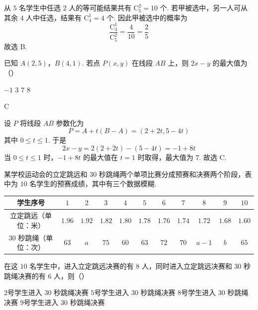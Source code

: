 \begin{solution}
从 \(5\) 名学生中任选 \(2\) 人的等可能结果共有 \(\mathrm C_5^2=10\) 个. 若甲被选中，另一人可从其余 \(4\) 人中任选，结果有 \(\mathrm C_4^1=4\) 个. 因此甲被选中的概率为
\[
\frac{\mathrm C_4^1}{\mathrm C_5^2}=\frac{4}{10}=\frac25
\]
故选 B.
\end{solution}

\begin{problem}
已知 \(A(2,5)\)，\(B(4,1)\). 若点 \(P(x,y)\) 在线段 \(AB\) 上，则 \(2x-y\) 的最大值为（\quad）

\choices
    {\(-1\)}
    {\(3\)}
    {\(7\)}
    {\(8\)}
\end{problem}

\begin{answer}
C
\end{answer}

\begin{solution}
设 \(P\) 将线段 \(AB\) 参数化为
\[
P=A+t(B-A)=(2+2t,5-4t)
\]
其中 \(0\leq t\leq1\).
于是
\[
2x-y=2(2+2t)-(5-4t)=-1+8t
\]
当 \(0\leq t\leq1\) 时，\(-1+8t\) 的最大值在 \(t=1\) 时取得，最大值为 \(7\). 故选 C.
\end{solution}

\begin{problem}
某学校运动会的立定跳远和 \(30\) 秒跳绳两个单项比赛分成预赛和决赛两个阶段，表中为 \(10\) 名学生的预赛成绩，其中有三个数据模糊.

\begin{center}
\begin{tabular}{|c|c|c|c|c|c|c|c|c|c|c|}
\hline
学生序号 & \(1\) & \(2\) & \(3\) & \(4\) & \(5\) & \(6\) & \(7\) & \(8\) & \(9\) & \(10\) \\
\hline
立定跳远（单位：米） & \(1.96\) & \(1.92\) & \(1.82\) & \(1.80\) & \(1.78\) & \(1.76\) & \(1.74\) & \(1.72\) & \(1.68\) & \(1.60\) \\
\hline
\(30\) 秒跳绳（单位：次） & \(63\) & \(a\) & \(75\) & \(60\) & \(63\) & \(72\) & \(70\) & \(a-1\) & \(b\) & \(65\) \\
\hline
\end{tabular}
\end{center}

在这 \(10\) 名学生中，进入立定跳远决赛的有 \(8\) 人，同时进入立定跳远决赛和 \(30\) 秒跳绳决赛的有 \(6\) 人，则（\quad）

\choices
    {\(2\)号学生进入 \(30\) 秒跳绳决赛}
    {\(5\)号学生进入 \(30\) 秒跳绳决赛}
    {\(8\)号学生进入 \(30\) 秒跳绳决赛}
    {\(9\)号学生进入 \(30\) 秒跳绳决赛}
\end{problem}

